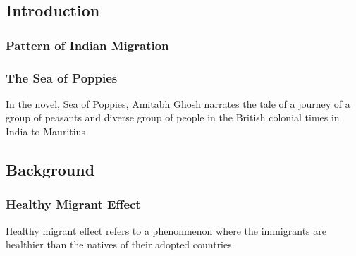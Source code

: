 \subsection{Introduction}

\subsubsection{Pattern of Indian Migration}

\subsubsection{The Sea of Poppies}
In the novel, Sea of Poppies, Amitabh Ghosh narrates the tale of a journey of a group of peasants and diverse group of people in the British colonial times in India to Mauritius \cite{ghosh2008sea}

\subsection{Background}

\subsubsection{Healthy Migrant Effect}

Healthy migrant effect refers to a phenonmenon where the immigrants are healthier than the natives of their adopted countries. 